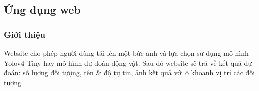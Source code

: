 \documentclass[20pt, a4paper]{article}
\begin{document}
\subsection{Ứng dụng web}
\subsubsection{Giới thiệu}
Website cho phép người dùng tải lên một bức ảnh và lựa chọn sử dụng mô hình Yolov4-Tiny hay mô hình dự đoán động vật. 
Sau đó website sẽ trả về kết quả dự đoán: số lượng đối tượng, tên \& độ tự tin, ảnh kết quả với ô khoanh vị trí các đối tượng

\pagebreak
\begin{figure}[H]
	\centering


\end{figure}
\end{document}
